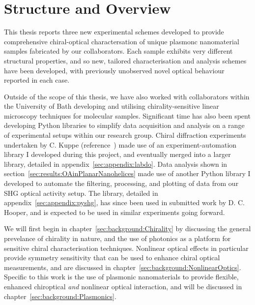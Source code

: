 \chapter{Structure and Overview}\label{sec:background:Introduction}

This thesis reports three new experimental schemes developed to provide comprehensive chiral-optical charactersation of unique plasmonc nanomaterial samples fabricated by our collaborators. Each sample exhibits very different structural properties, and so new, tailored characterisation and analysis schemes have been developed, with previously unobserved novel optical behaviour reported in each case.

Outside of the scope of this thesis, we have also worked with collaborators within the University of Bath developing and utilising chirality-sensitive linear microscopy techniques for molecular samples. Significant time has also been spent developing Python libraries to simplify data acquisition and analysis on a range of experimental setups within our research group. Chiral diffraction experiments undertaken by C. Kuppe (reference~\cite{Kuppe2018}) made use of an experiment-automation library I developed during this project, and eventually merged into a larger library, detailed in appendix~\ref{sec:appendix:labdo}. Data analysis shown in section~\ref{sec:results:OAinPlanarNanohelices} made use of another Python library I developed to automate the filtering, processing, and plotting of data from our SHG optical activity setup. The library, detailed in appendix~\ref{sec:appendix:pyshg}, has since been used in submitted work by D. C. Hooper, and is expected to be used in similar experiments going forward.

We will first begin in chapter~\ref{sec:background:Chirality} by discussing the general prevelance of chirality in nature, and the use of photonics as a platform for sensitive chiral characterisation techniques. Nonlinear optical effects in particular provide symmetry sensitivity that can be used to enhance chiral optical measurements, and are discussed in chapter~\ref{sec:background:NonlinearOptics}. Specific to this work is the use of plasmonic nanomaterials to provide flexible, enhanced chiroptical \textit{and} nonlinear optical interaction, and will be discussed in chapter~\ref{sec:background:Plasmonics}. 